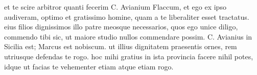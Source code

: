 


et te scire arbitror quanti fecerim C. Avianium Flaccum, et ego ex ipso audiveram, optimo et gratissimo homine, quam a te liberaliter esset tractatus. eius filios dignissimos illo patre meosque necessarios, quos ego unice diligo, commendo tibi sic, ut maiore studio nullos commendare possim.  C. Avianius in Sicilia est; Marcus est nobiscum. ut illius dignitatem praesentis ornes, rem utriusque defendas te rogo. hoc mihi gratius in ista provincia facere nihil potes, idque ut facias te vehementer etiam atque etiam rogo.
